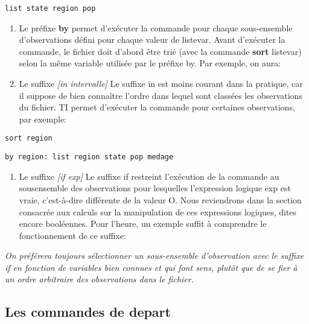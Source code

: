 \documentclass[
]{book}
\providecommand{\tightlist}{%
  \setlength{\itemsep}{0pt}\setlength{\parskip}{0pt}}
\begin{document}
\texttt{list\ state\ region\ pop}

\begin{enumerate}
\def\labelenumi{(\alph{enumi})}
\item
  Le préfixe \textbf{by}
  permet d'exécuter la commande pour chaque
  sous-ensemble d'observations défini pour chaque valeur de
  listevar. Avant d'exécuter la commande, le fichier doit
  d'abord être trié (avec la commande \textbf{sort} listevar) selon la
  même variable utilisée par le préfixe by. Par exemple, on aura:
\item
  Le suffixe \emph{{[}in intervalle{]}}
  Le suffixe in est moins courant dans la pratique, car il suppose
  de bien connaître l'ordre dans lequel sont classées les
  observations du fichier. TI permet d'exécuter la commande pour
  certaines observations, par exemple:
\end{enumerate}

\texttt{sort\ region}

\texttt{by\ region:\ list\ region\ state\ pop\ medage}

\begin{enumerate}
\def\labelenumi{(\alph{enumi})}
\setcounter{enumi}{1}
\tightlist
\item
  Le suffixe \emph{{[}if exp{]}}
  Le suffixe if restreint l'exécution de la commande au sousensemble
  des observations pour lesquelles l'expression logique
  exp est vraie, c'est-à-dire différente de la valeur O.
  Nous reviendrons dans la section consacrée aux calculs sur la
  manipulation de ces expressions logiques, dites encore
  booléennes. Pour l'heure, un exemple suffit à comprendre le
  fonctionnement de ce suffixe:
\end{enumerate}

\emph{On préférera toujours sélectionner un sous-ensemble d'observation avec le suffixe if en fonction de variables bien connues et qui font sens, plutôt que de se fier à un ordre arbitraire des observations dans le fichier. }

\hypertarget{les-commandes-de-depart}{%
\subsection{Les commandes de depart}\label{les-commandes-de-depart}}
\end{document}
